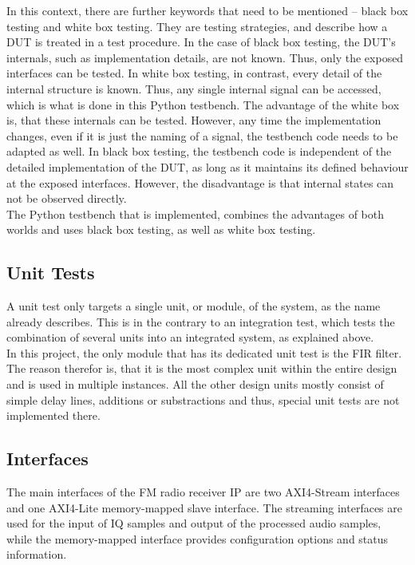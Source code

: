 In this context, there are further keywords that need to be mentioned -- black box testing and white box testing.
They are testing strategies, and describe how a DUT is treated in a test procedure.
In the case of black box testing, the DUT's internals, such as implementation details, are not known.
Thus, only the exposed interfaces can be tested.
In white box testing, in contrast, every detail of the internal structure is known.
Thus, any single internal signal can be accessed, which is what is done in this Python testbench.
The advantage of the white box is, that these internals can be tested.
However, any time the implementation changes, even if it is just the naming of a signal, the testbench code needs to be adapted as well.
In black box testing, the testbench code is independent of the detailed implementation of the DUT, as long as it maintains its defined behaviour at the exposed interfaces.
However, the disadvantage is that internal states can not be observed directly.\\

The Python testbench that is implemented, combines the advantages of both worlds and uses black box testing, as well as white box testing.

\subsection{Unit Tests}

A unit test only targets a single unit, or module, of the system, as the name already describes.
This is in the contrary to an integration test, which tests the combination of several units into an integrated system, as explained above.\\

In this project, the only module that has its dedicated unit test is the FIR filter.
The reason therefor is, that it is the most complex unit within the entire design and is used in multiple instances.
All the other design units mostly consist of simple delay lines, additions or substractions and thus, special unit tests are not implemented there.

\subsection{Interfaces}
\label{sec:impl:vhdl:interfaces}

The main interfaces of the FM radio receiver IP are two AXI4-Stream interfaces and one AXI4-Lite memory-mapped slave interface.
The streaming interfaces are used for the input of IQ samples and output of the processed audio samples, while the memory-mapped interface provides configuration options and status information.

